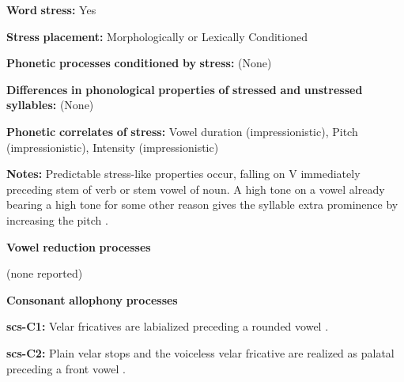 \begin{styleBody}
\textbf{Word} \textbf{stress:} Yes
\end{styleBody}

\begin{styleBody}
\textbf{Stress} \textbf{placement:} Morphologically or Lexically Conditioned
\end{styleBody}

\begin{styleBody}
\textbf{Phonetic} \textbf{processes} \textbf{conditioned} \textbf{by} \textbf{stress:} (None)
\end{styleBody}

\begin{styleBody}
\textbf{Differences} \textbf{in} \textbf{phonological} \textbf{properties} \textbf{of} \textbf{stressed} \textbf{and} \textbf{unstressed} \textbf{syllables:} (None)
\end{styleBody}

\begin{styleBody}
\textbf{Phonetic} \textbf{correlates} \textbf{of} \textbf{stress:} Vowel duration (impressionistic), Pitch (impressionistic), Intensity (impressionistic)
\end{styleBody}

\begin{styleBody}
\textbf{Notes:} Predictable stress-like properties occur, falling on V immediately preceding stem of verb or stem vowel of noun. A high tone on a vowel already bearing a high tone for some other reason gives the syllable extra prominence by increasing the pitch \citep[362]{Rice2005}.
\end{styleBody}

\begin{styleBody}
\textbf{Vowel} \textbf{reduction} \textbf{processes}
\end{styleBody}

\begin{styleBody}
(none reported)
\end{styleBody}

\begin{styleBody}
\textbf{Consonant} \textbf{allophony} \textbf{processes}
\end{styleBody}

\begin{styleBody}
\textbf{scs-C1:} Velar fricatives are labialized preceding a rounded vowel \citep[31]{Rice1989}.
\end{styleBody}

\begin{styleBody}
\textbf{scs-C2:} Plain velar stops and the voiceless velar fricative are realized as palatal preceding a front vowel \citep[31]{Rice1989}.
\end{styleBody}

